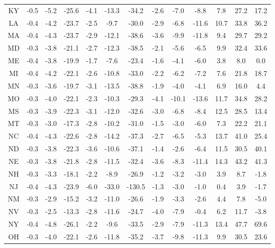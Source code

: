 \begin{table}
\begin{tabular}{ccccccccccccc}
   KY & -0.5 & -5.2 & -25.6 & -4.1 & -13.3 &  -34.2 & -2.6 &  -7.0 &  -8.8 &  7.8 & 27.2 & 17.2 \\
   LA & -0.4 & -4.2 & -23.7 & -2.5 &  -9.7 &  -30.0 & -2.9 &  -6.8 & -11.6 & 10.7 & 33.8 & 36.2 \\
   MA & -0.4 & -4.3 & -23.7 & -2.9 & -12.1 &  -38.6 & -3.6 &  -9.9 & -11.8 &  9.4 & 29.7 & 29.2 \\
   MD & -0.3 & -3.8 & -21.1 & -2.7 & -12.3 &  -38.5 & -2.1 &  -5.6 &  -6.5 &  9.9 & 32.4 & 33.6 \\
   ME & -0.4 & -3.8 & -19.9 & -1.7 &  -7.6 &  -23.4 & -1.6 &  -4.1 &  -6.0 &  3.8 &  8.0 &  0.0 \\
   MI & -0.4 & -4.2 & -22.1 & -2.6 & -10.8 &  -33.0 & -2.2 &  -6.2 &  -7.2 &  7.6 & 21.8 & 18.7 \\
   MN & -0.3 & -3.6 & -19.7 & -3.1 & -13.5 &  -38.8 & -1.9 &  -4.0 &  -4.1 &  6.9 & 16.0 &  4.4 \\
   MO & -0.3 & -4.0 & -22.1 & -2.3 & -10.3 &  -29.3 & -4.1 & -10.1 & -13.6 & 11.7 & 34.8 & 28.2 \\
   MS & -0.3 & -3.9 & -22.3 & -3.1 & -12.0 &  -32.6 & -3.0 &  -6.8 &  -8.4 & 12.5 & 28.5 & 13.4 \\
   MT & -0.3 & -3.0 & -17.3 & -2.8 & -10.2 &  -31.0 & -1.5 &  -3.0 &  -6.0 &  7.3 & 22.2 & 21.1 \\
   NC & -0.4 & -4.3 & -22.6 & -2.8 & -14.2 &  -37.3 & -2.7 &  -6.5 &  -5.3 & 13.7 & 41.0 & 25.4 \\
   ND & -0.3 & -3.8 & -22.3 & -3.6 & -10.6 &  -37.1 & -1.4 &  -2.6 &  -6.4 & 11.5 & 30.5 & 40.1 \\
   NE & -0.3 & -3.8 & -21.8 & -2.8 & -11.5 &  -32.4 & -3.6 &  -8.3 & -11.4 & 14.3 & 43.2 & 41.3 \\
   NH & -0.3 & -3.3 & -18.1 & -2.2 &  -8.9 &  -26.9 & -1.2 &  -3.2 &  -3.0 &  3.9 &  8.7 & -1.8 \\
   NJ & -0.4 & -4.3 & -23.9 & -6.0 & -33.0 & -130.5 & -1.3 &  -3.0 &  -1.0 &  0.4 &  3.9 & -1.7 \\
   NM & -0.3 & -2.9 & -15.2 & -3.2 & -11.0 &  -26.6 & -1.9 &  -3.3 &  -2.6 &  4.4 &  7.8 & -5.0 \\
   NV & -0.3 & -2.5 & -13.3 & -2.8 & -11.6 &  -24.7 & -4.0 &  -7.9 &  -0.4 &  6.2 & 11.7 & -3.8 \\
   NY & -0.4 & -4.8 & -26.1 & -2.2 &  -9.6 &  -33.5 & -2.9 &  -7.9 & -11.3 & 13.4 & 47.7 & 69.6 \\
   OH & -0.3 & -4.0 & -22.1 & -2.6 & -11.8 &  -35.2 & -3.7 &  -9.8 & -11.3 &  9.9 & 30.5 & 23.6 \\

\end{tabular}
\end{table}
